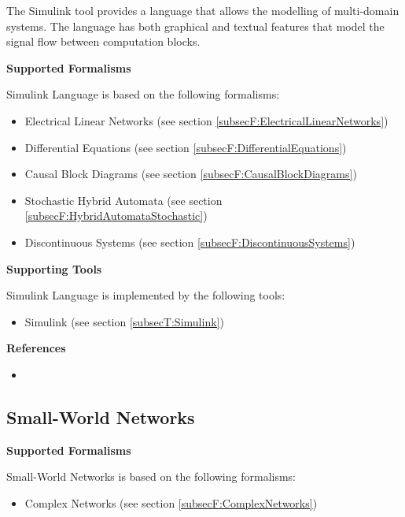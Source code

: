 The Simulink tool provides a language that allows the modelling of multi-domain systems. The language has both graphical and textual features that model the signal flow between computation blocks.

\textbf{Supported Formalisms}

Simulink Language is based on the following formalisms:
\begin{itemize}
	\item Electrical Linear Networks (see section \ref{subsecF:ElectricalLinearNetworks})
	\item Differential Equations (see section \ref{subsecF:DifferentialEquations})
	\item Causal Block Diagrams (see section \ref{subsecF:CausalBlockDiagrams})
	\item Stochastic Hybrid Automata (see section \ref{subsecF:HybridAutomataStochastic})
	\item Discontinuous Systems (see section \ref{subsecF:DiscontinuousSystems})
\end{itemize}


\textbf{Supporting Tools}

Simulink Language is implemented by the following tools:
\begin{itemize}
	\item Simulink (see section \ref{subsecT:Simulink})
\end{itemize}


\textbf{References}
\begin{itemize}
	
\item {}
\end{itemize}



\subsection{Small-World Networks}
\label{subsecL:SmallWorldNetworks}



\textbf{Supported Formalisms}

Small-World Networks is based on the following formalisms:
\begin{itemize}
	\item Complex Networks (see section \ref{subsecF:ComplexNetworks})
\end{itemize}


